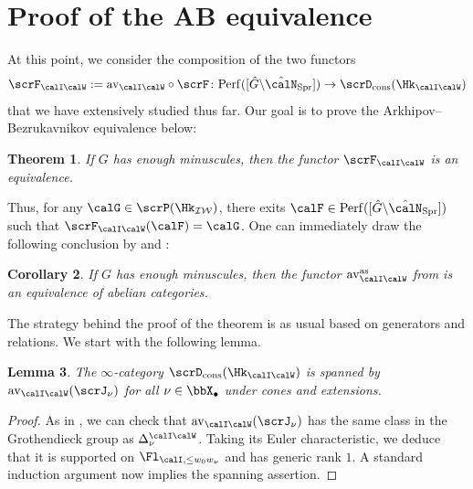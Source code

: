 \documentclass[10pt, reqno]{amsart}
\theoremstyle{plain}
\newtheorem{theorem}{Theorem}[section]
\newtheorem{lemma}[theorem]{Lemma}
\newtheorem{corollary}[theorem]{Corollary}
\theoremstyle{definition}
\numberwithin{equation}{section}
\begin{document}
\fi









\section{Proof of the AB equivalence}	

At this point, we consider the composition of the two functors
\begin{equation}\label{equation_AB-equivalence}
	\scrF_{\calI\calW}:=\mathrm{av}_{\calI\calW}\circ \scrF\colon \mathrm{Perf}([\hat{G}\backslash \hat{\calN}_{\mathrm{Spr}}])\to \scrD_{\mathrm{cons}}(\Hk_{\calI\calW})
\end{equation}
that we have extensively studied thus far. Our goal is to prove the Arkhipov--Bezrukavnikov equivalence below:

\begin{theorem}\label{thm_A-B}
	If $G$ has enough minuscules, then the functor $\scrF_{\calI\calW}$ is an equivalence.
\end{theorem}

Thus, for any $\calG\in \scrP(\Hk_{\mathcal{IW}})$, there exits  $\calF\in \mathrm{Perf}([\hat{G}\backslash \hat{\calN}_{\mathrm{Spr}}])$ such that $\scrF_{\calI\calW}(\calF)=\calG$. One can immediately draw the following conclusion by  and :

\begin{corollary}\label{coro_av_IWas_is_an_equiv}
	If $G$ has enough minuscules, then the functor $\mathrm{av}_{\calI\calW}^{\mathrm{as}}$ from  is an equivalence of abelian categories.
\end{corollary}

The strategy behind the proof of the theorem is as usual based on generators and relations. We start with the following lemma.

\begin{lemma}
	The $\infty$-category $\scrD_{\mathrm{cons}}(\Hk_{\calI\calW})$ is spanned by $\mathrm{av}_{\calI\calW}(\scrJ_\nu)$ for all $\nu \in \bbX_\bullet$ under cones and extensions.
\end{lemma}

\begin{proof}
	As in , we can check that $\mathrm{av}_{\calI\calW}(\scrJ_\nu)$ has the same class in the Grothendieck group as $\Delta_\nu^{\calI\calW}$. Taking its Euler characteristic, we deduce that it is supported on $\Fl_{\calI,\leq w_0w_\nu}$ and has generic rank $1$. A standard induction argument now implies the spanning assertion.
\end{proof}
\end{document}
